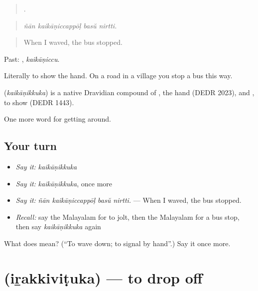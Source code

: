 \begin{quote}
   .
\end{quote}

\begin{quote}
\emph{ñān kaikāṇiccappōḷ basŭ nirtti.}
\end{quote}

\begin{quote}
When I waved, the bus stopped.
\end{quote}

Past: , \emph{kaikāṇiccu}.

Literally to show the hand. On a road in a village you stop a bus this way.

\begin{cousinweb}
\textbf{} (\emph{kaikāṇikkuka}) is a native Dravidian compound of , the hand (DEDR 2023), and , to show (DEDR 1443).
\end{cousinweb}

\begin{grammarlens}[title={What you've built}]
One more word for getting around.
\end{grammarlens}

\subsection*{Your turn}
\begin{itemize}
\raggedright
  \item \emph{Say it:} \emph{kaikāṇikkuka}
  \item \emph{Say it:} \emph{kaikāṇikkuka}, once more
  \item \emph{Say it:} \emph{ñān kaikāṇiccappōḷ basŭ nirtti.} — When I waved, the bus stopped.
  \item \emph{Recall:} say the Malayalam for to jolt, then the Malayalam for a bus stop, then say \emph{kaikāṇikkuka} again
\end{itemize}

\begin{tcolorbox}[breakable,colback=teal!4,colframe=teal!35!black,title={Before you move on}]
What does  mean? (\textquotedblleft{}To wave down; to signal by hand\textquotedblright{}.) Say it once more.
\end{tcolorbox}
\section[\texorpdfstring{\ml{ഇറക്കിവിടുക} (iṟakkiviṭuka)}{ഇറക്കിവിടുക (iṟakkiviṭuka)}]{ (iṟakkiviṭuka) — to drop off}

